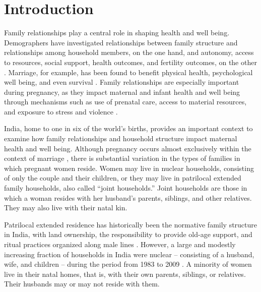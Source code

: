 \documentclass[10pt,twoside,reqno]{article}
\begin{document}

\section{Introduction}\label{sec:Introduction} %

Family relationships play a central role in shaping health and well being. Demographers have investigated relationships between family structure and relationships among household members, on the one hand, and autonomy, access to resources, social support, health outcomes, and fertility outcomes, on the other \citep{umberson2010social, axinn2017emotional, mclanahan2008family}. Marriage, for example, has been found to benefit physical health, psychological well being, and even survival \citep{carr2014happy,soons2009marriage,lillard1996marital}. Family relationships are especially important during pregnancy, as they impact maternal and infant health and well being through mechanisms such as use of prenatal care, access to material resources, and exposure to stress and violence \citep{osborne2012family,molina2025unmarried,bloom2001dimensions}.

India, home to one in six of the world’s births, provides an important context to examine how family relationships and household structure impact maternal health and well being.  Although pregnancy occurs almost exclusively within the context of marriage \citep{banerji2021does}, there is substantial variation in the types of families in which pregnant women reside. Women may live in nuclear households, consisting of only the couple and their children, or they may live in patrilocal extended family households, also called ``joint households.''  Joint households are those in which a woman resides with her husband’s parents, siblings, and other relatives.  They may also live with their natal kin.

Patrilocal extended residence has historically been the normative family structure in India, with land ownership, the responsibility to provide old-age support, and ritual practices organized along male lines \citep{jayachandran2015roots}.  However, a large and modestly increasing fraction of households in India were nuclear -- consisting of a husband, wife, and children -- during the period from 1983 to 2009 \citep{breton2021modernisation}.  A minority of women live in their natal homes, that is, with their own parents, siblings, or relatives.  Their husbands may or may not reside with them.
\end{document}
